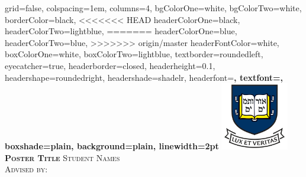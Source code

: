 \documentclass[landscape,final,a0paper,fontscale=0.29]{baposter}
\begin{document}
\begin{poster}%
  {
  grid=false,
  colspacing=1em,
  columns=4,
  bgColorOne=white,
  bgColorTwo=white,
  borderColor=black,
<<<<<<< HEAD
  headerColorOne=black,
  headerColorTwo=lightblue,
=======
  headerColorOne=blue,
  headerColorTwo=blue,
>>>>>>> origin/master
  headerFontColor=white,
  boxColorOne=white,
  boxColorTwo=lightblue,
  textborder=roundedleft,
  eyecatcher=true,
  headerborder=closed,
  headerheight=0.1\textheight,
  headershape=roundedright,
  headershade=shadelr,
  headerfont=\Large\bf\textsc, %
  textfont={\setlength{\parindent}{1.5em}},
  boxshade=plain,
  background=plain,
  linewidth=2pt
  }
    {\includegraphics[height=8em]{images/yale}}
  {\bf\textsc{Poster Title}\vspace{0.5em}}
  {\textsc{ Student Names\\ Advised by:}}
  {%

\setlength{\fboxsep}{0pt}%
\setlength{\fboxrule}{3pt}%
  }

    \newcommand{\colouredcircle}{%
      \tikz{\useasboundingbox (-0.2em,-0.32em) rectangle(0.2em,0.32em); \draw[draw=black,fill=lightblue,line width=0.03em] (0,0) circle(0.18em);}}



\end{poster}
\end{document}

